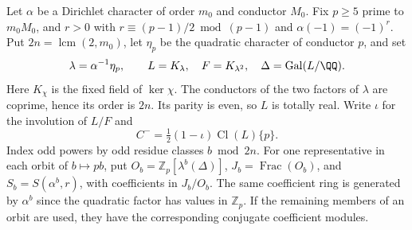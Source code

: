\documentclass[a4paper,11pt]{article}
\theoremstyle{definition}
\theoremstyle{remark}
\newcommand{\ZZ}{\mathbb Z}\newcommand{\ord}{\operatorname{ord}}
\numberwithin{equation}{section}
\begin{document}
Let \(\alpha\) be a Dirichlet character of order \(m_0\) and
conductor \(M_0\). Fix \(p\ge5\) prime to \(m_0M_0\), and \(r>0\)
with \(r\equiv(p-1)/2\bmod(p-1)\) and \(\alpha(-1)=(-1)^r\).
Put \(2n=\operatorname{lcm}(2,m_0)\), let \(\eta_p\) be the
quadratic character of conductor \(p\), and set
\[
       \lambda=\alpha^{-1}\eta_p,\qquad
       L=K_\lambda,\quad F=K_{\lambda^2},\quad
       \Delta=\operatorname{Gal}(L/\QQ).
\]
Here \(K_\chi\) is the fixed field of \(\ker\chi\). The conductors
of the two factors of \(\lambda\) are coprime, hence its order
is \(2n\). Its parity is even, so \(L\) is totally real. Write
\(\iota\) for the involution of \(L/F\) and
\[
              C^-=\tfrac12(1-\iota)\operatorname{Cl}(L)\{p\}.
\]
Index odd powers by odd residue classes \(b\bmod 2n\). For one
representative in each orbit of \(b\mapsto pb\), put
\(O_b=\ZZ_p[\lambda^b(\Delta)]\), \(J_b=\operatorname{Frac}(O_b)\),
and \(S_b=S(\alpha^b,r)\), with coefficients in \(J_b/O_b\).
The same coefficient ring is generated by \(\alpha^b\) since
the quadratic factor has values in \(\ZZ_p\). If the remaining
members of an orbit are used, they have the corresponding
conjugate coefficient modules.
\end{document}
